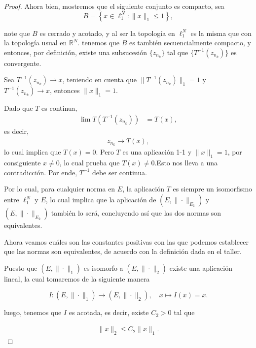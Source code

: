 \begin{enumerate}
\begin{proof}
Ahora bien, mostremos que el siguiente conjunto es compacto, sea 
$$
B = \left\{ x \in \ell_1^N : \|x\|_1 \leq 1 \right\},
$$

note que $B$ es cerrado y acotado, y al ser la topología en $\ell_1^N$ es la misma que con la topología usual en $\mathbb{R}^N$. tenemos que  $B$ es también secuencialmente compacto, y entonces, por definición, existe una subsucesión $\{z_{n_k}\}$ tal que $\{T^{-1}(z_{n_k})\}$ es convergente.

Sea $T^{-1}(z_{n_k}) \to x$, teniendo en cuenta que $\|T^{-1}(z_{n_k})\|_1 = 1$ y $T^{-1}(z_{n_k}) \to x$, entonces $\|x\|_1 = 1$.

Dado que $T$ es continua,
\begin{align*}
\lim T(T^{-1}(z_{n_k})) &= T(x),
\end{align*}
es decir,
\begin{align*}
z_{n_k} \to T(x),
\end{align*}
lo cual implica que $T(x) = 0$. Pero $T$ es una aplicación 1-1 y $\|x\|_1 = 1$, por consiguiente $x \neq 0$, lo cual prueba que $T(x) \neq 0$.Esto nos lleva a una contradicción. Por ende, $T^{-1}$ debe ser continua.

Por lo cual, para cualquier norma en $E$, la aplicación $T$ es siempre un isomorfismo entre $\ell_1^N$ y $E$, lo cual implica que la aplicación de $(E, \|\cdot\|_{E_1})$ y $(E, \|\cdot\|_{E_2})$ también lo será, concluyendo así que las dos normas son equivalentes.


Ahora veamos cuáles son las constantes positivas con las que podemos establecer que las normas son equivalentes, de acuerdo con la definición dada en el taller.

Puesto que $(E,\| \cdot \|_1)$ es isomorfo a $(E, \|\cdot\|_2)$ existe una aplicación lineal, la cual tomaremos de la siguiente manera

\[
I : (E, \| \cdot \|_1) \longrightarrow (E, \| \cdot \|_2), \quad x \mapsto I(x) = x.
\]

luego, tenemos que $I$ es acotada, es decir, existe $C_2>0$ tal que 

\begin{align*}
    \|x\|_2 \leq C_2 \|x\|_1
.\end{align*}


\end{proof}
\end{enumerate}
